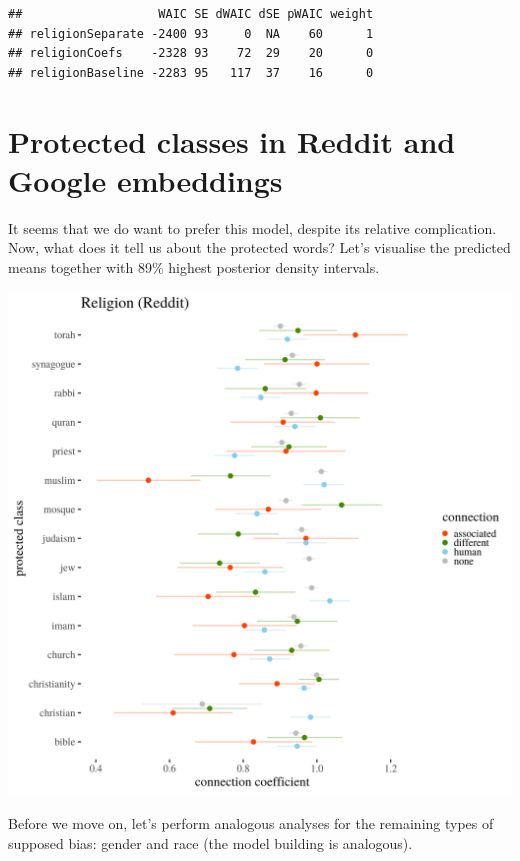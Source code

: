 \documentclass[
  12pt,
]{book}
\begin{document}
\begin{verbatim}
##                   WAIC SE dWAIC dSE pWAIC weight
## religionSeparate -2400 93     0  NA    60      1
## religionCoefs    -2328 93    72  29    20      0
## religionBaseline -2283 95   117  37    16      0
\end{verbatim}

\normalsize

\hypertarget{protected-classes-in-reddit-and-google-embeddings}{%
\section{Protected classes in Reddit and Google embeddings}\label{protected-classes-in-reddit-and-google-embeddings}}

It seems that we do want to prefer this model, despite its relative complication. Now, what does it tell us about the protected words? Let's visualise the predicted means together with 89\% highest posterior density intervals.

\includegraphics[width=14cm]{../images/visReligionReddit.png}

Before we move on, let's perform analogous analyses for the remaining types of supposed bias: gender and race (the model building is analogous).
\end{document}
